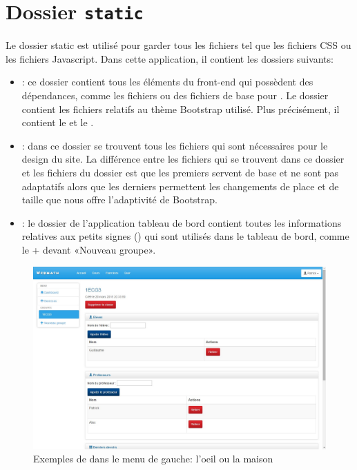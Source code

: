 \documentclass[a4paper,10pt,french]{sphinxmanual}
\begin{document}
\section{Dossier \texttt{static}}
\label{documentation:dossier-static}
Le dossier static est utilisé pour garder tous les fichiers tel que
les fichiers CSS ou les fichiers Javascript.
Dans cette application, il contient les dossiers suivants:
\begin{itemize}
\item {} 
: ce dossier contient tous les éléments du front-end
qui possèdent des dépendances, comme les fichiers  ou des
fichiers de base pour . Le dossier  contient
les fichiers relatifs au thème Bootstrap utilisé. Plus précisément, il
contient le  et le .

\item {} 
: dans ce dossier se trouvent tous les fichiers  qui sont
nécessaires pour le design du site. La différence entre les fichiers qui
se trouvent dans ce dossier et les fichiers  du dossier
 est que les premiers servent de base et ne sont pas
adaptatifs alors que les derniers permettent les changements de place et
de taille que nous offre l'adaptivité de Bootstrap.

\item {} 
: le dossier  de l'application tableau de bord contient toutes
les informations relatives aux petits signes () qui sont
utilisés dans le tableau de bord, comme le + devant «Nouveau groupe».

\end{itemize}
\begin{figure}[htbp]
\centering
\capstart

\includegraphics[width=0.600\linewidth]{class.jpg}
\caption{Exemples de  dans le menu de gauche: l'oeil ou la maison}\end{figure}
\end{document}
